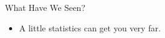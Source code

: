 \documentclass[12pt,ignorenonframetext,]{beamer}
\providecommand{\tightlist}{%
	\setlength{\itemsep}{0pt}\setlength{\parskip}{0pt}}
\begin{document}
\begin{frame}{What Have We Seen?}
\protect\hypertarget{what-have-we-seen}{}

\begin{itemize}
\tightlist
\item
  A little statistics can get you very far.
\end{itemize}

\end{frame}
\end{document}
